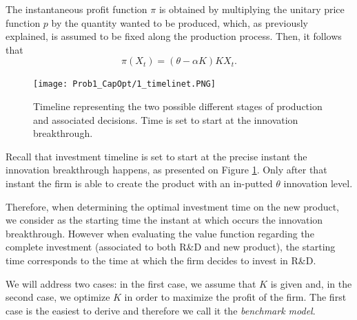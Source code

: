 The instantaneous profit function $\pi$ is obtained by multiplying the unitary price function $p$ by the quantity wanted to be produced, which, as previously explained, is assumed to be fixed along the production process. Then, it follows that
\begin{equation}
\pi(X_t)=(\theta-\alpha K)K X_t.
\label{prob1:pi}
\end{equation}

\begin{figure}[!htb]
	\centering
	\texttt{[image: Prob1\_CapOpt/1\_timelinet.PNG]}
	\caption{Timeline representing the two possible different stages of production and associated decisions. Time is set to start at the innovation breakthrough.}
	\label{1_time}
\end{figure}

Recall that investment timeline is set to start at the precise instant the innovation breakthrough happens, as presented on Figure \ref{1_time}. Only after that instant the firm is able to create the product with an in-putted $\theta$ innovation level.







Therefore, when determining the optimal investment time on the new product, we consider as the starting time the instant at which occurs the innovation breakthrough. However when evaluating the value function regarding the complete investment (associated to both R\&D and new product), the starting time corresponds to the time at which the firm decides to invest in R\&D.







We will address two cases: in the first case, we assume that $K$ is given and, in the second case, we optimize $K$ in order to maximize the profit of the firm. The first case is the easiest to derive and therefore we call it the \textit{benchmark model}.



